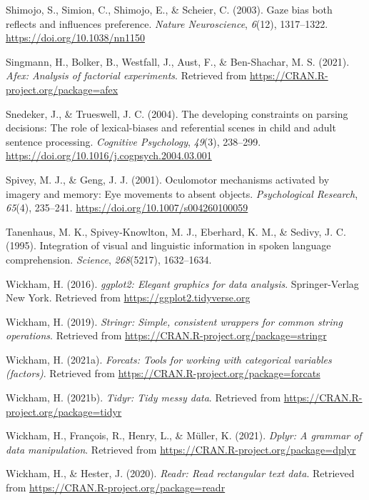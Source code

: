 \documentclass[
  man,floatsintext]{apa6}
\newlength{\cslhangindent}
\newlength{\cslentryspacingunit} %
\newenvironment{CSLReferences}[2] %
 {%
  \setlength{\parindent}{0pt}
  \ifodd #1
  \let\oldpar\par
  \def\par{\hangindent=\cslhangindent\oldpar}
  \fi
  \setlength{\parskip}{#2\cslentryspacingunit}
 }%
 {}
\begin{document}
\begin{CSLReferences}{1}{0}
\leavevmode{}%
Shimojo, S., Simion, C., Shimojo, E., \& Scheier, C. (2003). Gaze bias both reflects and influences preference. \emph{Nature Neuroscience}, \emph{6}(12), 1317--1322. \url{https://doi.org/10.1038/nn1150}

\leavevmode{}%
Singmann, H., Bolker, B., Westfall, J., Aust, F., \& Ben-Shachar, M. S. (2021). \emph{Afex: Analysis of factorial experiments}. Retrieved from \url{https://CRAN.R-project.org/package=afex}

\leavevmode{}%
Snedeker, J., \& Trueswell, J. C. (2004). The developing constraints on parsing decisions: {The} role of lexical-biases and referential scenes in child and adult sentence processing. \emph{Cognitive Psychology}, \emph{49}(3), 238--299. \url{https://doi.org/10.1016/j.cogpsych.2004.03.001}

\leavevmode{}%
Spivey, M. J., \& Geng, J. J. (2001). Oculomotor mechanisms activated by imagery and memory: Eye movements to absent objects. \emph{Psychological Research}, \emph{65}(4), 235--241. \url{https://doi.org/10.1007/s004260100059}

\leavevmode{}%
Tanenhaus, M. K., Spivey-Knowlton, M. J., Eberhard, K. M., \& Sedivy, J. C. (1995). Integration of visual and linguistic information in spoken language comprehension. \emph{Science}, \emph{268}(5217), 1632--1634.

\leavevmode{}%
Wickham, H. (2016). \emph{ggplot2: Elegant graphics for data analysis}. Springer-Verlag New York. Retrieved from \url{https://ggplot2.tidyverse.org}

\leavevmode{}%
Wickham, H. (2019). \emph{Stringr: Simple, consistent wrappers for common string operations}. Retrieved from \url{https://CRAN.R-project.org/package=stringr}

\leavevmode{}%
Wickham, H. (2021a). \emph{Forcats: Tools for working with categorical variables (factors)}. Retrieved from \url{https://CRAN.R-project.org/package=forcats}

\leavevmode{}%
Wickham, H. (2021b). \emph{Tidyr: Tidy messy data}. Retrieved from \url{https://CRAN.R-project.org/package=tidyr}

\leavevmode{}%
Wickham, H., François, R., Henry, L., \& Müller, K. (2021). \emph{Dplyr: A grammar of data manipulation}. Retrieved from \url{https://CRAN.R-project.org/package=dplyr}

\leavevmode{}%
Wickham, H., \& Hester, J. (2020). \emph{Readr: Read rectangular text data}. Retrieved from \url{https://CRAN.R-project.org/package=readr}

\end{CSLReferences}

\endgroup
\end{document}
